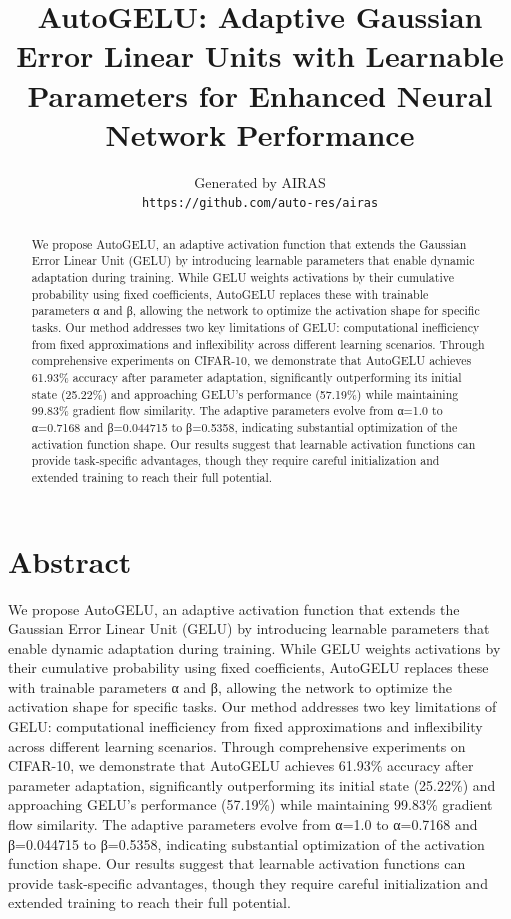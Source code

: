 \documentclass[10pt]{article}
\title{AutoGELU: Adaptive Gaussian Error Linear Units with Learnable Parameters for Enhanced Neural Network Performance}
\author{
  Generated by AIRAS\\
  \texttt{https://github.com/auto-res/airas}
}
\begin{document}
\maketitle

\begin{abstract}
We propose AutoGELU, an adaptive activation function that extends the Gaussian Error Linear Unit (GELU) by introducing learnable parameters that enable dynamic adaptation during training. While GELU weights activations by their cumulative probability using fixed coefficients, AutoGELU replaces these with trainable parameters α and β, allowing the network to optimize the activation shape for specific tasks. Our method addresses two key limitations of GELU: computational inefficiency from fixed approximations and inflexibility across different learning scenarios. Through comprehensive experiments on CIFAR-10, we demonstrate that AutoGELU achieves 61.93\% accuracy after parameter adaptation, significantly outperforming its initial state (25.22\%) and approaching GELU's performance (57.19\%) while maintaining 99.83\% gradient flow similarity. The adaptive parameters evolve from α=1.0 to α=0.7168 and β=0.044715 to β=0.5358, indicating substantial optimization of the activation function shape. Our results suggest that learnable activation functions can provide task-specific advantages, though they require careful initialization and extended training to reach their full potential.
\end{abstract}


\section{Abstract}

We propose AutoGELU, an adaptive activation function that extends the Gaussian Error Linear Unit (GELU) by introducing learnable parameters that enable dynamic adaptation during training. While GELU weights activations by their cumulative probability using fixed coefficients, AutoGELU replaces these with trainable parameters α and β, allowing the network to optimize the activation shape for specific tasks. Our method addresses two key limitations of GELU: computational inefficiency from fixed approximations and inflexibility across different learning scenarios. Through comprehensive experiments on CIFAR-10, we demonstrate that AutoGELU achieves 61.93\% accuracy after parameter adaptation, significantly outperforming its initial state (25.22\%) and approaching GELU's performance (57.19\%) while maintaining 99.83\% gradient flow similarity. The adaptive parameters evolve from α=1.0 to α=0.7168 and β=0.044715 to β=0.5358, indicating substantial optimization of the activation function shape. Our results suggest that learnable activation functions can provide task-specific advantages, though they require careful initialization and extended training to reach their full potential.
\end{document}
